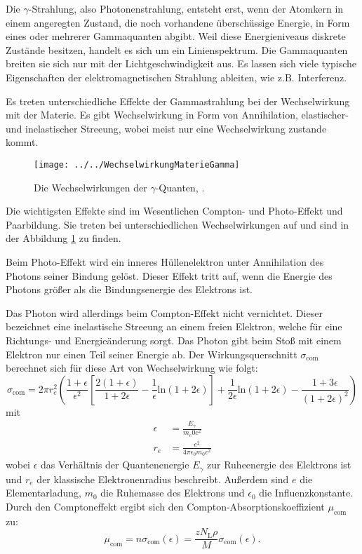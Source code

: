 Die $\gamma$-Strahlung, also Photonenstrahlung, entsteht erst, wenn der Atomkern in einem angeregten Zustand, die noch vorhandene überschüssige Energie, in Form eines oder mehrerer Gammaquanten abgibt. Weil diese Energieniveaus diskrete Zustände besitzen, handelt es sich um ein Linienspektrum. Die Gammaquanten breiten sie sich nur mit der Lichtgeschwindigkeit aus. Es lassen sich viele typische Eigenschaften der elektromagnetischen Strahlung ableiten, wie z.B. Interferenz.

Es treten unterschiedliche Effekte der Gammastrahlung bei der Wechselwirkung mit der Materie. Es gibt Wechselwirkung in Form von Annihilation, elastischer- und inelastischer Streeung, wobei meist nur eine Wechselwirkung zustande kommt. 

\begin{figure}[h!]
	\centering
	\texttt{[image: ../../WechselwirkungMaterieGamma]}
	\caption{Die Wechselwirkungen der $\gamma$-Quanten, \cite[4]{anleitung704}.}
	\label{fig:wechselwirkungmateriegamma}
\end{figure}

Die wichtigsten Effekte sind im Wesentlichen Compton- und Photo-Effekt und Paarbildung. Sie treten bei unterschiedlichen Wechselwirkungen auf und sind in der Abbildung \ref{fig:wechselwirkungmateriegamma} zu finden. 

Beim Photo-Effekt wird ein inneres Hüllenelektron unter Annihilation des Photons seiner Bindung gelöst. Dieser Effekt tritt auf, wenn die Energie des Photons größer als die Bindungsenergie des Elektrons ist.

Das Photon wird allerdings beim Compton-Effekt nicht vernichtet. Dieser bezeichnet eine inelastische Streeung an einem freien Elektron, welche für eine Richtungs- und Energieänderung sorgt. Das Photon gibt beim Stoß mit einem Elektron nur einen Teil seiner Energie ab. Der Wirkungsquerschnitt $\sigma_\text{com}$ berechnet sich für diese Art von Wechselwirkung wie folgt:
\begin{equation*}
\sigma_\text{com} = 2 \pi r_e^2 \left(\frac{1+\epsilon}{\epsilon^{2}}\left[\frac{2(1+\epsilon)}{1+2\epsilon}-\frac{1}{\epsilon}\text{ln}(1+2\epsilon)\right]+\frac{1}{2\epsilon}\text{ln}(1+2\epsilon)-\frac{1+3\epsilon}{(1+2\epsilon)^2}\right)
\end{equation*}
mit \begin{align*}
\epsilon &= \frac{E_\gamma}{m_e0 c^2} \\
r_e &= \frac{e^2}{4 \pi \epsilon_0 m_0 c^2}
\end{align*}
wobei $\epsilon$ das Verhältnis der Quantenenergie $E_\gamma$ zur Ruheenergie des Elektrons ist und $r_e$ der klassische Elektronenradius beschreibt. Außerdem sind $e$ die Elementarladung, $m_0$ die Ruhemasse des Elektrons und $\epsilon_0$ die Influenzkonstante. Durch den Comptoneffekt ergibt sich den Compton-Absorptionskoeffizient $\mu_\text{com}$ zu:
\begin{equation*}
\mu_\text{com} = n\sigma_\text{com}(\epsilon) = \frac{zN_\text{L}\rho}{M}\sigma_\text{com}(\epsilon).
\end{equation*}

